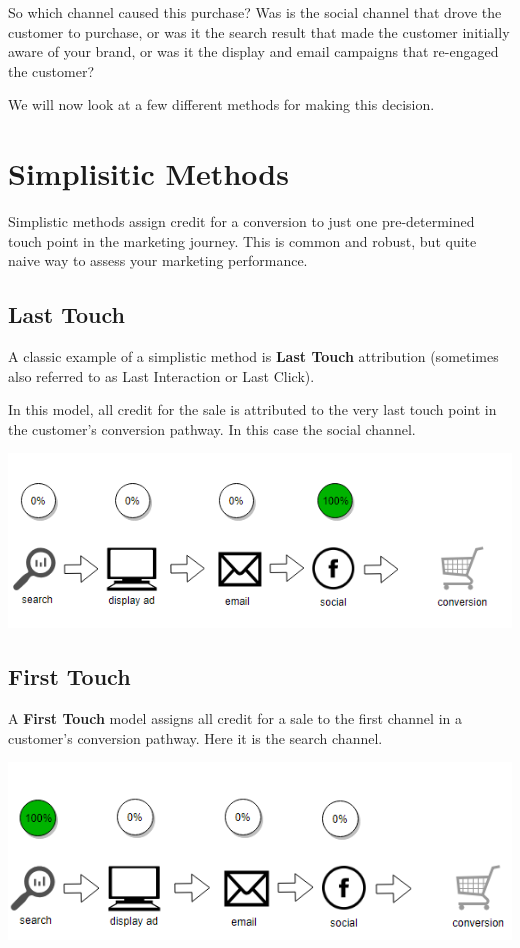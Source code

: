 \documentclass[]{book}
\begin{document}
So which channel caused this purchase? Was is the social channel that
drove the customer to purchase, or was it the search result that made
the customer initially aware of your brand, or was it the display and
email campaigns that re-engaged the customer?

We will now look at a few different methods for making this decision.

\section{Simplisitic Methods}\label{simplisitic-methods}

Simplistic methods assign credit for a conversion to just one
pre-determined touch point in the marketing journey. This is common and
robust, but quite naive way to assess your marketing performance.

\subsection{Last Touch}\label{last-touch}

A classic example of a simplistic method is \textbf{Last Touch}
attribution (sometimes also referred to as Last Interaction or Last
Click).

In this model, all credit for the sale is attributed to the very last
touch point in the customer's conversion pathway. In this case the
social channel.

\includegraphics[width=5.88in]{img/last_touch}

\subsection{First Touch}\label{first-touch}

A \textbf{First Touch} model assigns all credit for a sale to the first
channel in a customer's conversion pathway. Here it is the search
channel.

\includegraphics[width=5.65in]{img/first_touch}
\end{document}

